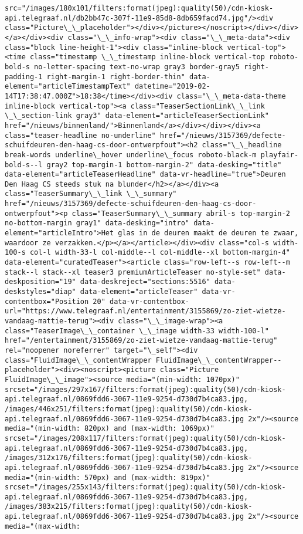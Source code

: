 \documentclass[11pt]{article}
\begin{document}
\begin{Verbatim}[commandchars=\\\{\}]
src="/images/180x101/filters:format(jpeg):quality(50)/cdn-kiosk-api.telegraaf.nl/db2bb47c-307f-11e9-85d8-8db659facd74.jpg"/><div class="Picture\_\_placeholder"></div></picture></noscript></div></div></a></div><div class="\_\_info-wrap"><div class="\_\_meta-data"><div class="block line-height-1"><div class="inline-block vertical-top"><time class="timestamp \_\_timestamp inline-block vertical-top roboto-bold-s no-letter-spacing text-no-wrap gray3 border-gray5 right-padding-1 right-margin-1 right-border-thin" data-element="articleTimestampText" datetime="2019-02-14T17:38:47.000Z">18:38</time></div><div class="\_\_meta-data-theme inline-block vertical-top"><a class="TeaserSectionLink\_\_link \_\_section-link gray3" data-element="articleTeaserSectionLink" href="/nieuws/binnenland/">Binnenland</a></div></div></div><a class="teaser-headline no-underline" href="/nieuws/3157369/defecte-schuifdeuren-den-haag-cs-door-ontwerpfout"><h2 class="\_\_headline break-words underline\_hover underline\_focus roboto-black-m playfair-bold-s--l gray2 top-margin-1 bottom-margin-2" data-desking="title" data-element="articleTeaserHeadline" data-vr-headline="true">Deuren Den Haag CS steeds stuk na blunder</h2></a></div><a class="TeaserSummary\_\_link \_\_summary" href="/nieuws/3157369/defecte-schuifdeuren-den-haag-cs-door-ontwerpfout"><p class="TeaserSummary\_\_summary abril-s top-margin-2 no-bottom-margin gray1" data-desking="intro" data-element="articleIntro">Het glas in de deuren maakt de deuren te zwaar, waardoor ze verzakken.</p></a></article></div><div class="col-s width-100-s col-l width-33-l col-middle--l col-middle--xl bottom-margin-4" data-element="curatedTeaser"><article class="row-left--s row-left--m stack--l stack--xl teaser3 premiumArticleTeaser no-style-set" data-deskposition="19" data-deskreject="sections:5516" data-deskstyles="diap" data-element="articleTeaser" data-vr-contentbox="Position 20" data-vr-contentbox-url="https://www.telegraaf.nl/entertainment/3155869/zo-ziet-wietze-vandaag-mattie-terug"><div class="\_\_image-wrap"><a class="TeaserImage\_\_container \_\_image width-33 width-100-l" href="/entertainment/3155869/zo-ziet-wietze-vandaag-mattie-terug" rel="noopener noreferrer" target="\_self"><div class="FluidImage\_\_contentWrapper FluidImage\_\_contentWrapper--placeholder"><div><noscript><picture class="Picture FluidImage\_\_image"><source media="(min-width: 1070px)" srcset="/images/297x167/filters:format(jpeg):quality(50)/cdn-kiosk-api.telegraaf.nl/0869fdd6-3067-11e9-9254-d730d7b4ca83.jpg, /images/446x251/filters:format(jpeg):quality(50)/cdn-kiosk-api.telegraaf.nl/0869fdd6-3067-11e9-9254-d730d7b4ca83.jpg 2x"/><source media="(min-width: 820px) and (max-width: 1069px)" srcset="/images/208x117/filters:format(jpeg):quality(50)/cdn-kiosk-api.telegraaf.nl/0869fdd6-3067-11e9-9254-d730d7b4ca83.jpg, /images/312x176/filters:format(jpeg):quality(50)/cdn-kiosk-api.telegraaf.nl/0869fdd6-3067-11e9-9254-d730d7b4ca83.jpg 2x"/><source media="(min-width: 570px) and (max-width: 819px)" srcset="/images/255x143/filters:format(jpeg):quality(50)/cdn-kiosk-api.telegraaf.nl/0869fdd6-3067-11e9-9254-d730d7b4ca83.jpg, /images/383x215/filters:format(jpeg):quality(50)/cdn-kiosk-api.telegraaf.nl/0869fdd6-3067-11e9-9254-d730d7b4ca83.jpg 2x"/><source media="(max-width: 
\end{Verbatim}
\end{document}
